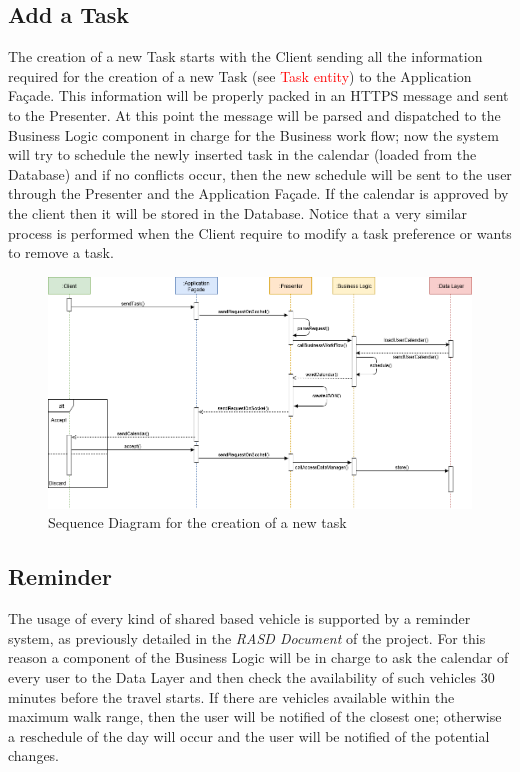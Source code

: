 \subsection{Add a Task}
The creation of a new Task starts with the Client sending all the information required for the creation of a new Task (see \textcolor{red}{Task entity}) to the Application Façade. This information will be properly packed in an HTTPS message and sent to the Presenter. At this point the message will be parsed and dispatched to the Business Logic component in charge for the Business work flow; now the system will try to schedule the newly inserted task in the calendar (loaded from the Database) and if no conflicts occur, then the new schedule will be sent to the user through the Presenter and the Application Façade. If the calendar is approved by the client then it will be stored in the Database.
Notice that a very similar process is performed when the Client require to modify a task preference or wants to remove a task. 

\begin{figure}[H]
    \centering
    \includegraphics[scale=0.4]{Pictures/RunTimeView/addTask.png}
    \caption{Sequence Diagram for the creation of a new task}
    \label{fig:sequenceAddTask}
\end{figure}

\subsection{Reminder}
The usage of every kind of shared based vehicle is supported by a reminder system, as previously detailed in the \emph{RASD Document} of the project. For this reason a component of the Business Logic will be in charge to ask the calendar of every user to the Data Layer and then check the availability of such vehicles 30 minutes before the travel starts. If there are vehicles available within the maximum walk range, then the user will be notified of the closest one; otherwise a reschedule of the day will occur and the user will be notified of the potential changes. 


